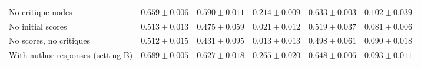 \begin{table}[t]
\begin{tabular}{lccccc}
No critique nodes & $0.659 \pm 0.006$ & $0.590 \pm 0.011$ & $0.214 \pm 0.009$ & $0.633 \pm 0.003$ & $0.102 \pm 0.039$ \\
No initial scores & $0.513 \pm 0.013$ & $0.475 \pm 0.059$ & $0.021 \pm 0.012$ & $0.519 \pm 0.037$ & $0.081 \pm 0.006$ \\
No scores, no critiques & $0.512 \pm 0.015$ & $0.431 \pm 0.095$ & $0.013 \pm 0.013$ & $0.498 \pm 0.061$ & $0.090 \pm 0.018$ \\
With author responses (setting B) & $0.689 \pm 0.005$ & $0.627 \pm 0.018$ & $0.265 \pm 0.020$ & $0.648 \pm 0.006$ & $0.093 \pm 0.011$ \\
\bottomrule
\end{tabular}
\end{table}

